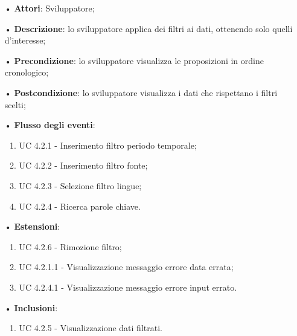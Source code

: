 \begin{itemize}
\item[•]\textbf{Attori}: Sviluppatore;
\item[•]\textbf{Descrizione}: lo sviluppatore applica dei filtri ai dati, ottenendo solo quelli d'interesse;
\item[•]\textbf{Precondizione}: lo sviluppatore visualizza le proposizioni in ordine cronologico;
\item[•]\textbf{Postcondizione}: lo sviluppatore visualizza i dati che rispettano i filtri scelti;
\item[•]\textbf{Flusso degli eventi}:
\begin{enumerate}
\item UC 4.2.1 - Inserimento filtro periodo temporale;
\item UC 4.2.2 - Inserimento filtro {fonte};
\item UC 4.2.3 - Selezione filtro lingue;
\item UC 4.2.4 - Ricerca parole chiave.
\end{enumerate}
\item[•]\textbf{Estensioni}:
\begin{enumerate}
	\item UC 4.2.6 - Rimozione filtro;
	\item UC 4.2.1.1 - Visualizzazione messaggio errore data errata;
	\item UC 4.2.4.1 - Visualizzazione messaggio errore input errato.
\end{enumerate}
\item[•]\textbf{Inclusioni}:
\begin{enumerate}
\item UC 4.2.5 - Visualizzazione dati filtrati.
\end{enumerate}
\end{itemize}
